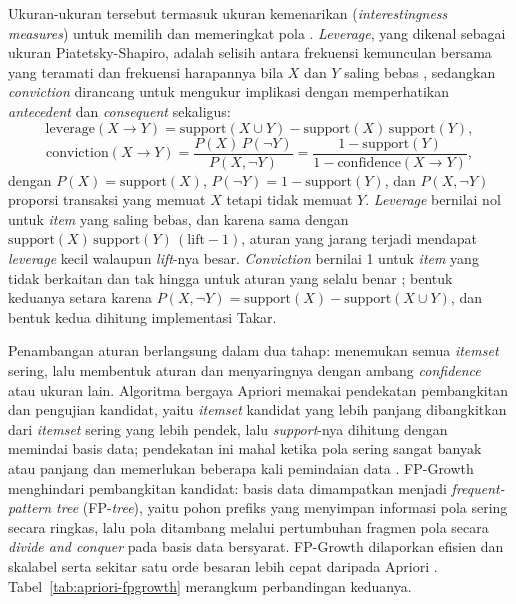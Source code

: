 Ukuran-ukuran tersebut termasuk ukuran kemenarikan (\textit{interestingness measures}) untuk memilih dan memeringkat pola \citep*{geng2006interestingness}. \textit{Leverage}, yang dikenal sebagai ukuran Piatetsky-Shapiro, adalah selisih antara frekuensi kemunculan bersama yang teramati dan frekuensi harapannya bila $X$ dan $Y$ saling bebas \citep*{geng2006interestingness}, sedangkan \textit{conviction} dirancang \citet*{brin1997dynamic} untuk mengukur implikasi dengan memperhatikan \textit{antecedent} dan \textit{consequent} sekaligus:
\begin{equation}
\mathrm{leverage}(X \rightarrow Y) = \mathrm{support}(X \cup Y) - \mathrm{support}(X)\,\mathrm{support}(Y),
\label{eq:leverage}
\end{equation}
\begin{equation}
\mathrm{conviction}(X \rightarrow Y) = \frac{P(X)\,P(\neg Y)}{P(X, \neg Y)} = \frac{1 - \mathrm{support}(Y)}{1 - \mathrm{confidence}(X \rightarrow Y)},
\label{eq:conviction}
\end{equation}
dengan $P(X) = \mathrm{support}(X)$, $P(\neg Y) = 1 - \mathrm{support}(Y)$, dan $P(X, \neg Y)$ proporsi transaksi yang memuat $X$ tetapi tidak memuat $Y$. \textit{Leverage} bernilai nol untuk \textit{item} yang saling bebas, dan karena sama dengan $\mathrm{support}(X)\,\mathrm{support}(Y)\,(\mathrm{lift} - 1)$, aturan yang jarang terjadi mendapat \textit{leverage} kecil walaupun \textit{lift}-nya besar. \textit{Conviction} bernilai 1 untuk \textit{item} yang tidak berkaitan dan tak hingga untuk aturan yang selalu benar \citep*{brin1997dynamic}; bentuk keduanya setara karena $P(X, \neg Y) = \mathrm{support}(X) - \mathrm{support}(X \cup Y)$, dan bentuk kedua dihitung implementasi Takar.

Penambangan aturan berlangsung dalam dua tahap: menemukan semua \textit{itemset} sering, lalu membentuk aturan dan menyaringnya dengan ambang \textit{confidence} atau ukuran lain. Algoritma bergaya Apriori memakai pendekatan pembangkitan dan pengujian kandidat, yaitu \textit{itemset} kandidat yang lebih panjang dibangkitkan dari \textit{itemset} sering yang lebih pendek, lalu \textit{support}-nya dihitung dengan memindai basis data; pendekatan ini mahal ketika pola sering sangat banyak atau panjang \citep*{han2000mining, han2004mining} dan memerlukan beberapa kali pemindaian data \citep*{brin1997dynamic}. FP-Growth menghindari pembangkitan kandidat: basis data dimampatkan menjadi \textit{frequent-pattern tree} (FP-\textit{tree}), yaitu pohon prefiks yang menyimpan informasi pola sering secara ringkas, lalu pola ditambang melalui pertumbuhan fragmen pola secara \textit{divide and conquer} pada basis data bersyarat. FP-Growth dilaporkan efisien dan skalabel serta sekitar satu orde besaran lebih cepat daripada Apriori \citep*{han2000mining, han2004mining}. Tabel~\ref{tab:apriori-fpgrowth} merangkum perbandingan keduanya.

